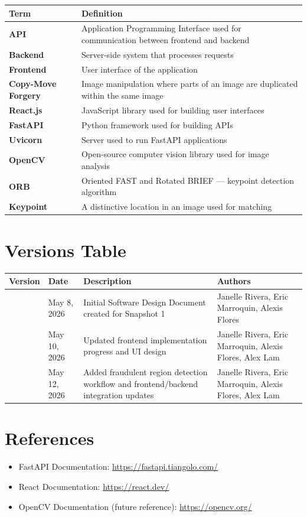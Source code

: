 \documentclass[12pt]{article}
\begin{document}
\begin{longtable}{>{\bfseries}p{} p{}}
\toprule
Term & Definition \\
\midrule
\endhead
API & Application Programming Interface used for communication between frontend and backend \\[0.5em]
Backend & Server-side system that processes requests \\[0.5em]
Frontend & User interface of the application \\[0.5em]
Copy-Move Forgery & Image manipulation where parts of an image are duplicated within the same image \\[0.5em]
React.js & JavaScript library used for building user interfaces \\[0.5em]
FastAPI & Python framework used for building APIs \\[0.5em]
Uvicorn & Server used to run FastAPI applications \\[0.5em]
OpenCV & Open-source computer vision library used for image analysis \\[0.5em]
ORB & Oriented FAST and Rotated BRIEF --- keypoint detection algorithm \\[0.5em]
Keypoint & A distinctive location in an image used for matching \\
\bottomrule
\end{longtable}

\section{Versions Table}

\begin{table}[h]
\centering
\begin{tabular}{>{\centering}p{} >{\centering}p{} p{} p{}}
\toprule
\textbf{Version} & \textbf{Date} & \textbf{Description} & \textbf{Authors} \\
\midrule
1.0 & May 8, 2026 & Initial Software Design Document created for Snapshot 1 & Janelle Rivera, Eric Marroquin, Alexis Flores \\[0.5em]
1.1 & May 10, 2026 & Updated frontend implementation progress and UI design & Janelle Rivera, Eric Marroquin, Alexis Flores, Alex Lam \\[0.5em]
1.2 & May 12, 2026 & Added fraudulent region detection workflow and frontend/backend integration updates & Janelle Rivera, Eric Marroquin, Alexis Flores, Alex Lam \\
\bottomrule
\end{tabular}
\end{table}

\section{References}

\begin{itemize}[noitemsep]
    \item FastAPI Documentation: \url{https://fastapi.tiangolo.com/}
    \item React Documentation: \url{https://react.dev/}
    \item OpenCV Documentation (future reference): \url{https://opencv.org/}
\end{itemize}
\end{document}

